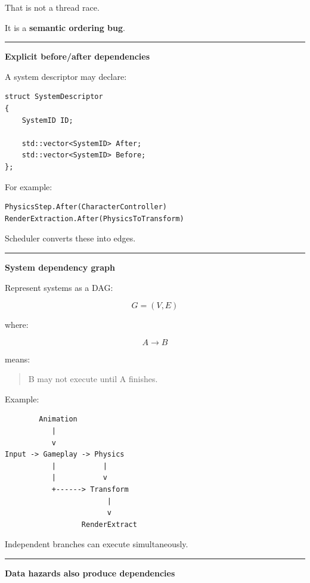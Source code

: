 That is not a thread race.

It is a \textbf{semantic ordering bug}.

\begin{center}\rule{0.5\linewidth}{0.5pt}\end{center}

\textbf{Explicit before/after dependencies}

A system descriptor may declare:

\begin{verbatim}
struct SystemDescriptor
{
    SystemID ID;

    std::vector<SystemID> After;
    std::vector<SystemID> Before;
};
\end{verbatim}

For example:

\begin{verbatim}
PhysicsStep.After(CharacterController)
RenderExtraction.After(PhysicsToTransform)
\end{verbatim}

Scheduler converts these into edges.

\begin{center}\rule{0.5\linewidth}{0.5pt}\end{center}

\textbf{System dependency graph}

Represent systems as a DAG:

\[
G=(V,E)
\]

where:

\[
A\rightarrow B
\]

means:

\begin{quote}
B may not execute until A finishes.
\end{quote}

Example:

\begin{verbatim}
        Animation
           |
           v
Input -> Gameplay -> Physics
           |           |
           |           v
           +------> Transform
                        |
                        v
                  RenderExtract
\end{verbatim}

Independent branches can execute simultaneously.

\begin{center}\rule{0.5\linewidth}{0.5pt}\end{center}

\textbf{Data hazards also produce dependencies}

